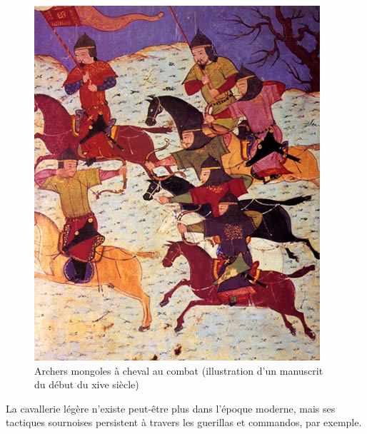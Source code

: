 \documentclass{article}
\begin{document}
\begin{center}
\begin{figure}[H]
\begin{minipage}[H]{0.4\linewidth}
	\includegraphics[width=\linewidth]{../ressources/MongolCavalrymen}
	\caption{Archers mongoles à cheval au combat (illustration d'un manuscrit du début du xive siècle) \cite{mongol_army}}
\end{minipage}
\hfill
\end{figure}
\end{center}
La cavallerie légère n'existe peut-être plus dans l'époque moderne, mais ses tactiques sournoises persistent à travers les guerillas et commandos, par exemple.
\end{document}
